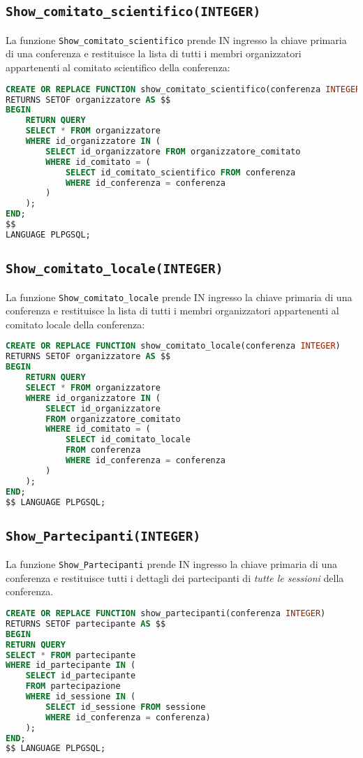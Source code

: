 \subsection{\texttt{Show\_comitato\_scientifico(INTEGER)}}
La funzione \texttt{Show\_comitato\_scientifico} prende IN ingresso la chiave primaria di una conferenza e restituisce la lista di tutti i membri organizzatori appartenenti al comitato scientifico della conferenza:
\begin{lstlisting}[language=SQL, style=mystyle]
CREATE OR REPLACE FUNCTION show_comitato_scientifico(conferenza INTEGER)
RETURNS SETOF organizzatore AS $$
BEGIN
	RETURN QUERY
	SELECT * FROM organizzatore
	WHERE id_organizzatore IN (
		SELECT id_organizzatore FROM organizzatore_comitato
		WHERE id_comitato = (
			SELECT id_comitato_scientifico FROM conferenza
			WHERE id_conferenza = conferenza
		)
	);
END;
$$ 
LANGUAGE PLPGSQL;
\end{lstlisting}
\subsection{\texttt{Show\_comitato\_locale(INTEGER)}}
La funzione \texttt{Show\_comitato\_locale} prende IN ingresso la chiave primaria di una conferenza e restituisce la lista di tutti i membri organizzatori appartenenti al comitato locale della conferenza:
\begin{lstlisting}[language=SQL, style=mystyle]
CREATE OR REPLACE FUNCTION show_comitato_locale(conferenza INTEGER)
RETURNS SETOF organizzatore AS $$
BEGIN
	RETURN QUERY
	SELECT * FROM organizzatore
	WHERE id_organizzatore IN (
		SELECT id_organizzatore 
		FROM organizzatore_comitato
		WHERE id_comitato = (
			SELECT id_comitato_locale 
			FROM conferenza
			WHERE id_conferenza = conferenza
		)
	);
END;
$$ LANGUAGE PLPGSQL;
\end{lstlisting}
\subsection{\texttt{Show\_Partecipanti(INTEGER)}}
La funzione \texttt{Show\_Partecipanti} prende IN ingresso la chiave primaria di una conferenza e restituisce tutti i dettagli dei partecipanti di \textit{tutte le sessioni} della conferenza.
\begin{lstlisting}[language=SQL,style=mystyle]
CREATE OR REPLACE FUNCTION show_partecipanti(conferenza INTEGER)
RETURNS SETOF partecipante AS $$
BEGIN
RETURN QUERY
SELECT * FROM partecipante
WHERE id_partecipante IN (
	SELECT id_partecipante 
	FROM partecipazione
	WHERE id_sessione IN (
		SELECT id_sessione FROM sessione
		WHERE id_conferenza = conferenza)
	);
END;
$$ LANGUAGE PLPGSQL;
\end{lstlisting}
